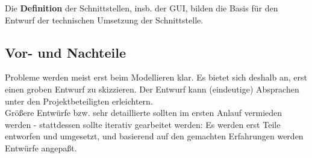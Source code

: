 \noindent
Die \textbf{Definition} der Schnittstellen, insb. der GUI, bilden die Basis für den Entwurf der technischen Umsetzung der Schnittstelle.

\subsection*{Vor- und Nachteile}
Probleme werden meist erst beim Modellieren klar.
Es bietet sich deshalb an, erst einen groben Entwurf zu skizzieren.
Der Entwurf kann (eindeutige) Absprachen unter den Projektbeteiligten erleichtern.\\

\noindent
Größere Entwürfe bzw. sehr detaillierte sollten im ersten Anlauf vermieden werden - stattdessen sollte iterativ gearbeitet werden: Es werden erst Teile entworfen und umgesetzt, und basierend auf den gemachten Erfahrungen werden Entwürfe angepaßt.


